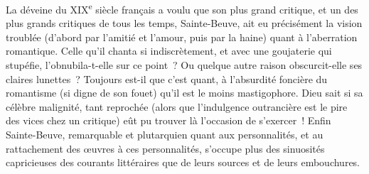 \documentclass[french,twoside]{book} %
\begin{document}
La déveine du XIX\textsuperscript{e} siècle français a voulu que son plus grand critique, et un des plus grands critiques de tous les temps, Sainte-Beuve, ait eu précisément la vision troublée (d’abord par l’amitié et l’amour, puis par la haine) quant à l’aberration romantique. Celle qu’il chanta si indiscrètement, et avec une goujaterie qui stupéfie, l’obnubila-t-elle sur ce point ? Ou quelque autre raison obscurcit-elle ses claires lunettes ? Toujours est-il que c’est quant, à l’absurdité foncière du romantisme (si digne de son fouet) qu’il est le moins mastigophore. Dieu sait si sa célèbre malignité, tant reprochée (alors que l’indulgence outrancière est le pire des vices chez un critique) eût pu trouver là l’occasion de s’exercer ! Enfin Sainte-Beuve, remarquable et plutarquien quant aux personnalités, et au rattachement des œuvres à ces personnalités, s’occupe plus des sinuosités capricieuses des courants littéraires que de leurs sources et de leurs embouchures.\par
\end{document}
